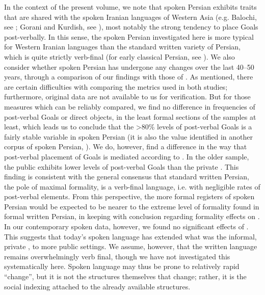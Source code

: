 \documentclass[output=paper,colorlinks,citecolor=brown,draftmode]{langscibook}
\begin{document}
In the context of the present volume, we note that spoken Persian exhibits traits that are shared with the spoken Iranian languages of Western Asia (e.g. Balochi, see ; Gorani and Kurdish, see ), most notably the strong tendency to place Goals post-verbally. In this sense, the spoken Persian investigated here is more typical for Western Iranian languages than the standard written variety of Persian, which is quite strictly verb-final (for early classical Persian, see ). We also consider whether spoken Persian has undergone any changes over the last 40--50 years, through a comparison of our findings with those of \citet{frommer_post-verbal_1981}. As mentioned, there are certain difficulties with comparing the metrics used in both studies; furthermore,  original data are not available to us for verification. But for those measures which can be reliably compared, we find no difference in frequencies of post-verbal Goals or direct objects, in the least formal sections of the samples at least, which leads us to conclude that the >80\% levels of post-verbal Goals is a fairly stable variable in spoken Persian (it is also the value identified in another corpus of spoken Persian, \citealt{Adibfar2019Persian}). We do, however, find a difference in the way that post-verbal placement of Goals is mediated according to . In the older sample, the public  exhibits lower levels of post-verbal Goals than the private . This finding is consistent with the general consensus that standard written Persian, the pole of maximal formality, is a verb-final language, i.e. with negligible rates of post-verbal elements. From this perspective, the more formal registers of spoken Persian would be expected to be nearer to the extreme level of formality found in formal written Persian, in keeping with  conclusion regarding formality effects on . In our contemporary spoken data, however, we found no significant effects of . This suggests that today's spoken language has extended what was the informal, private , to more public settings. We assume, however, that the written language remains overwhelmingly verb final, though we have not investigated this systematically here. Spoken language may thus be prone to relatively rapid ``change'', but it is not the structures themselves that change; rather, it is the social indexing attached to the already available structures.
\end{document}
